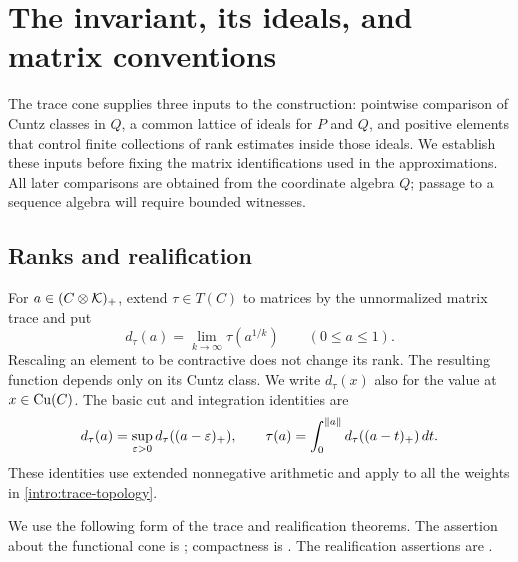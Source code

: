 \section{The invariant, its ideals, and matrix conventions}
\label{sec:structure}

The trace cone supplies three inputs to the construction: pointwise
comparison of Cuntz classes in \(Q\), a common lattice of ideals for
\(P\) and \(Q\), and positive elements that control finite collections
of rank estimates inside those ideals. We establish these inputs
before fixing the matrix identifications used in the approximations.
All later comparisons are obtained from the coordinate algebra
\(Q\); passage to a sequence algebra will require bounded witnesses.

\subsection{Ranks and realification}

For \(a\in(C\otimes\mathcal K)_+\), extend \(\tau\in T(C)\) to matrices by
the unnormalized matrix trace and put
\begin{equation}\label{st:rank}
 d_\tau(a)=\lim_{k\to\infty}\tau(a^{1/k})
 \qquad(0\leq a\leq1).
\end{equation}
Rescaling an element to be contractive does not change its rank.
The resulting function depends only on its Cuntz class. We write
\(d_\tau(x)\) also for the value at \(x\in\operatorname{Cu}(C)\).
The basic cut and integration identities are
\begin{equation}\label{st:rank-cuts}
 d_\tau(a)=\sup_{\varepsilon>0}d_\tau((a-\varepsilon)_+),
 \qquad
 \tau(a)=\int_0^{\|a\|}d_\tau((a-t)_+)\,dt.
\end{equation}
These identities use extended nonnegative arithmetic and apply to all
the weights in \eqref{intro:trace-topology}.

We use the following form of the trace and realification theorems.
The assertion about the functional cone is
\cite[Proposition~4.2, Remark~4.3, and Theorem~4.4]{ERS}; compactness
is \cite[Theorem~3.7]{ERS}. The realification assertions are
\cite[Proposition~3.1.1 and Theorems~3.2.1 and~5.1.2]{Robert}.

